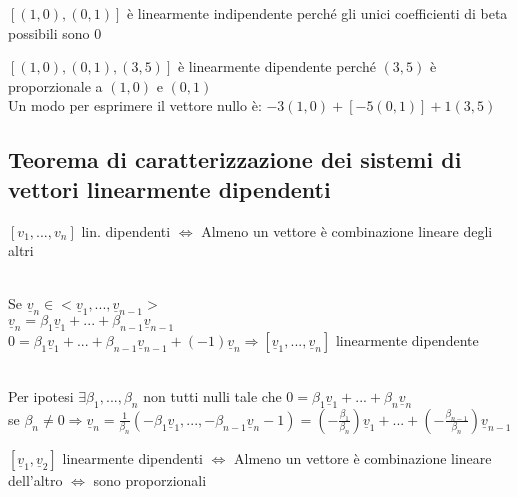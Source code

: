 \begin{es}
	$[(1,0),(0,1)]$ è linearmente indipendente perché gli unici coefficienti di beta possibili sono 0
\end{es}

\begin{es}
	$[(1,0),(0,1),(3,5)]$ è linearmente dipendente perché $(3,5)$ è proporzionale a $(1,0)$ e $(0,1)$\\
	Un modo per esprimere il vettore nullo è: $-3(1,0)+[-5(0,1)]+1(3,5)$
\end{es}

\subsection{Teorema di caratterizzazione dei sistemi di vettori linearmente dipendenti}

\begin{teorema}
	$[v_1,...,v_n]$ lin. dipendenti $\Longleftrightarrow $ Almeno un vettore è combinazione lineare degli altri\\
	\begin{dimostrazione}
		\phantom{}\\
		Se $\underline{v}_n\in <\underline{v}_1,...,\underline{v}_{n-1}>$\\
		$\underline{v}_n=\beta_1 \underline{v}_1+...+\beta_{n-1} \underline{v}_{n-1}$\\
		$0=\beta_1 \underline{v}_1+...+\beta_{n-1}\underline{v}_{n-1}+(-1)\underline{v}_n \Longrightarrow [\underline{v}_1,...,\underline{v}_n]$ linearmente dipendente 
	\end{dimostrazione}
	\begin{dimostrazione}
		\phantom{}\\
		Per ipotesi $\exists\beta_1,...,\beta_n$ non tutti nulli tale che $0=\beta_1 \underline{v}_1+...+\beta_n \underline{v}_n$\\
		se $\beta_n\neq 0\Longrightarrow  \underline{v}_n=\frac{1}{\beta_n}(-\beta_1 \underline{v}_1,...,-\beta_{n-1}\underline{v}_n-1)=(-\frac{\beta_1}{\beta_n})\underline{v}_1+...+(-\frac{\beta_{n-1}}{\beta_n})\underline{v}_{n-1}$
	\end{dimostrazione}
\end{teorema}

\begin{corollario}
	$[\underline{v}_1,\underline{v}_2]$ linearmente dipendenti $\Longleftrightarrow$ Almeno un vettore è combinazione lineare dell'altro $\Longleftrightarrow $ sono proporzionali
\end{corollario}

